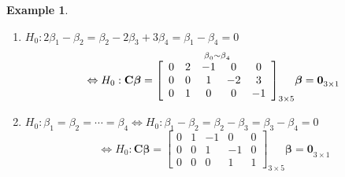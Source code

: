 \documentclass{article}
\newtheorem{example}[theorem]{Example}
\begin{document}
\begin{example}
\begin{enumerate}
\begin{enumerate}
\item $H_{0}:2\beta _{1}-\beta _{2}=\beta _{2}-2\beta _{3}+3\beta _{4}=\beta
_{1}-\beta _{4}=0$%
\begin{equation*}
\Leftrightarrow H_{0}:\mathbf{C\beta }=\overset{\beta _{0}\sim \beta _{4}}{%
\left[ 
\begin{array}{ccccc}
0 & 2 & -1 & 0 & 0 \\ 
0 & 0 & 1 & -2 & 3 \\ 
0 & 1 & 0 & 0 & -1%
\end{array}%
\right] }_{3\times 5}\mathbf{\beta =0}_{3\times 1}
\end{equation*}

\item $H_{0}:\beta _{1}=\beta _{2}=\cdots =\beta _{4}\Leftrightarrow
H_{0}:\beta _{1}-\beta _{2}=\beta _{2}-\beta _{3}=\beta _{3}-\beta _{4}=0$%
\begin{equation*}
\Leftrightarrow H_{0}:\mathbf{C\beta }=\left[ 
\begin{array}{ccccc}
0 & 1 & -1 & 0 & 0 \\ 
0 & 0 & 1 & -1 & 0 \\ 
0 & 0 & 0 & 1 & 1%
\end{array}%
\right] _{3\times 5}\mathbf{\beta =0}_{3\times 1}
\end{equation*}
\end{enumerate}
\end{enumerate}
\end{example}

\bigskip
\end{document}
